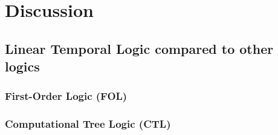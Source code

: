 \section{Discussion}
\subsection{Linear Temporal Logic compared to other logics}
\subsubsection{First-Order Logic (FOL)}
\subsubsection{Computational Tree Logic (CTL)}